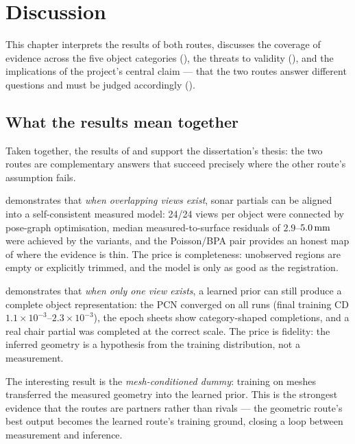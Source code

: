\chapter{Discussion}
\label{ch:discussion}

This chapter interprets the results of both routes, discusses the coverage of
evidence across the five object categories (), the
threats to validity (), and the implications of the
project's central claim --- that the two routes answer different questions and
must be judged accordingly ().

\section{What the results mean together}
\label{sec:disc_together}

Taken together, the results of  and 
support the dissertation's thesis: the two routes are complementary answers
that succeed precisely where the other route's assumption fails.

\routeA{} demonstrates that \emph{when overlapping views exist}, sonar
partials can be aligned into a self-consistent measured model: 24/24 views per
object were connected by pose-graph optimisation, median measured-to-surface
residuals of $2.9$--$5.0\,\text{mm}$ were achieved by the variants, and the
Poisson/BPA pair provides an honest map of where the evidence is thin. The
price is completeness: unobserved regions are empty or explicitly trimmed, and
the model is only as good as the registration.

\routeB{} demonstrates that \emph{when only one view exists}, a learned prior
can still produce a complete object representation: the PCN converged on all
runs (final training CD $1.1\times10^{-3}$--$2.3\times10^{-3}$), the epoch
sheets show category-shaped completions, and a real chair partial was
completed at the correct scale. The price is fidelity: the inferred geometry is
a hypothesis from the training distribution, not a measurement.

The interesting result is the \emph{mesh-conditioned dummy}: training \routeB{}
on \routeA{} meshes transferred the measured geometry into the learned prior.
This is the strongest evidence that the routes are partners rather than rivals
--- the geometric route's best output becomes the learned route's training
ground, closing a loop between measurement and inference.

